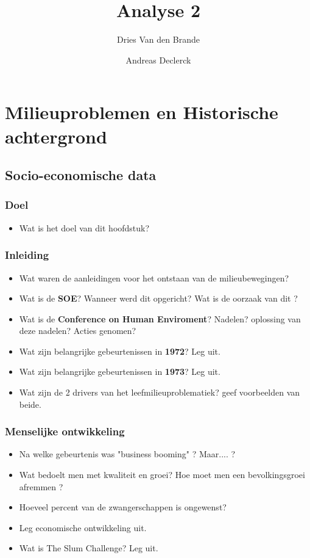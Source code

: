 \documentclass[12pt]{article}
\begin{document}
    \title{Analyse 2}
    \author{Dries Van den Brande \and Andreas Declerck}

    \maketitle

    \section{Milieuproblemen en Historische achtergrond}
    \subsection{Socio-economische data}
    \subsubsection*{Doel}
    \begin{itemize}
        \item Wat is het doel van dit hoofdstuk?
    \end{itemize}

    \subsubsection*{Inleiding}
    \begin{itemize}
        \item Wat waren de aanleidingen voor het ontstaan van de milieubewegingen?
        \item Wat is de \textbf{SOE}? Wanneer werd dit opgericht? Wat is de oorzaak van dit ?
        \item Wat is de \textbf{Conference on Human Enviroment}? Nadelen? oplossing van deze nadelen? Acties genomen?
        \item Wat zijn belangrijke gebeurtenissen in \textbf{1972}? Leg uit.
        \item Wat zijn belangrijke gebeurtenissen in \textbf{1973}? Leg uit.
        \item Wat zijn de 2 drivers van het leefmilieuproblematiek? geef voorbeelden van beide.
    \end{itemize}

    \subsubsection*{Menselijke ontwikkeling}
    \begin{itemize}
        \item Na welke gebeurtenis was "business booming" ? Maar.... ?
        \item Wat bedoelt men met kwaliteit en groei? Hoe moet men een bevolkingsgroei afremmen ?
        \item Hoeveel percent van de zwangerschappen is ongewenst?
        \item Leg economische ontwikkeling uit. 
        \item Wat is The Slum Challenge? Leg uit.
    \end{itemize}
\end{document}
